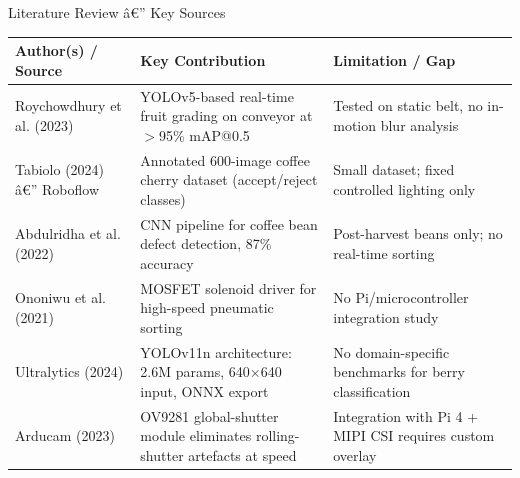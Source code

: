 \documentclass[aspectratio=169, 11pt]{beamer}
\begin{document}
\begin{frame}[shrink=5]{Literature Review â€” Key Sources}
\small
\begin{tabular}{@{}p{3.2cm}p{5.0cm}p{4.0cm}@{}}
  \toprule
  \textbf{Author(s) / Source} & \textbf{Key Contribution} & \textbf{Limitation / Gap}\\
  \midrule
  Roychowdhury et al. (2023) &
    YOLOv5-based real-time fruit grading on conveyor at $>$95\% mAP@0.5 &
    Tested on static belt, no in-motion blur analysis \\[4pt]

  Tabiolo (2024) â€” Roboflow &
    Annotated 600-image coffee cherry dataset (accept/reject classes) &
    Small dataset; fixed controlled lighting only \\[4pt]

  Abdulridha et al. (2022) &
    CNN pipeline for coffee bean defect detection, 87\% accuracy &
    Post-harvest beans only; no real-time sorting \\[4pt]

  Ononiwu et al. (2021) &
    MOSFET solenoid driver for high-speed pneumatic sorting &
    No Pi/microcontroller integration study \\[4pt]

  Ultralytics (2024) &
    YOLOv11n architecture: 2.6M params, 640$\times$640 input, ONNX export &
    No domain-specific benchmarks for berry classification \\[4pt]

  Arducam (2023) &
    OV9281 global-shutter module eliminates rolling-shutter artefacts at speed &
    Integration with Pi 4 + MIPI CSI requires custom overlay \\
  \bottomrule
\end{tabular}
\end{frame}
\end{document}
